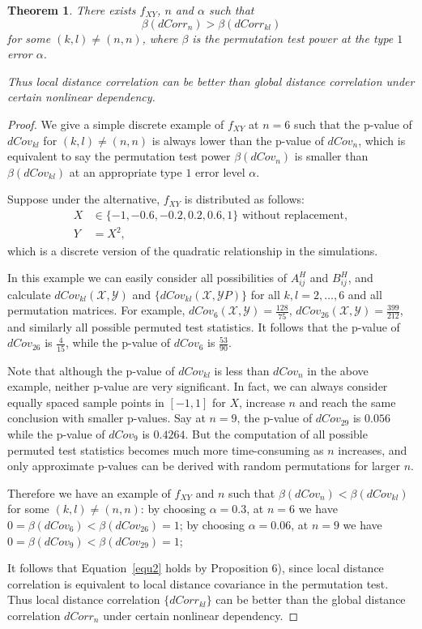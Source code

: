 \documentclass[12pt]{article}
\newtheorem{thm}{Theorem}
\begin{document}
\begin{thm}
\label{thm3}
There exists $f_{XY}$, $n$ and $\alpha$ such that 
\begin{equation}
\label{equ2}
\beta(dCorr_{n}) > \beta(dCorr_{kl})
\end{equation}
for some $(k,l) \neq (n,n)$, where $\beta$ is the permutation test power at the type $1$ error $\alpha$.

Thus local distance correlation can be better than global distance correlation under certain nonlinear dependency.
\end{thm}
\begin{proof}
We give a simple discrete example of $f_{XY}$ at $n=6$ such that the p-value of $dCov_{kl}$ for $(k,l) \neq (n,n)$ is always lower than the p-value of $dCov_{n}$, which is equivalent to say the permutation test power $\beta(dCov_{n})$ is smaller than $\beta(dCov_{kl})$ at an appropriate type $1$ error level $\alpha$.

Suppose under the alternative, $f_{XY}$ is distributed as follows:
\begin{align*} 
X &\in \{-1,-0.6,-0.2,0.2,0.6,1\} \mbox{ without replacement}, \\
Y &= X^2,
\end{align*}
which is a discrete version of the quadratic relationship in the simulations.

In this example we can easily consider all possibilities of $A^{H}_{ij}$ and $B^{H}_{ij}$, and calculate $dCov_{kl}(\mathcal{X}, \mathcal{Y})$ and $\{dCov_{kl}(\mathcal{X}, \mathcal{Y}P)\}$ for all $k,l=2,\ldots,6$ and all permutation matrices. For example, $dCov_{6}(\mathcal{X}, \mathcal{Y})=\frac{128}{75}$, $dCov_{26}(\mathcal{X}, \mathcal{Y})=\frac{399}{212}$, and similarly all possible permuted test statistics. It follows that the p-value of $dCov_{26}$ is $\frac{4}{15}$, while the p-value of $dCov_{6}$ is $\frac{53}{90}$. 

Note that although the p-value of $dCov_{kl}$ is less than $dCov_{n}$ in the above example, neither p-value are very significant. In fact, we can always consider equally spaced sample points in $[-1,1]$ for $X$, increase $n$ and reach the same conclusion with smaller p-values. Say at $n=9$, the p-value of $dCov_{29}$ is $0.056$ while the p-value of $dCov_{9}$ is $0.4264$. But the computation of all possible permuted test statistics becomes much more time-consuming as $n$ increases, and only approximate p-values can be derived with random permutations for larger $n$.

Therefore we have an example of $f_{XY}$ and $n$ such that $\beta(dCov_{n}) < \beta(dCov_{kl})$ for some $(k,l) \neq (n,n)$: by choosing $\alpha=0.3$, at $n=6$ we have $0=\beta(dCov_{6}) < \beta(dCov_{26})=1$; by choosing $\alpha=0.06$, at $n=9$ we have $0=\beta(dCov_{9}) < \beta(dCov_{29})=1$; 

It follows that Equation~\ref{equ2} holds by Proposition 6), since local distance correlation is equivalent to local distance covariance in the permutation test. Thus local distance correlation $\{dCorr_{kl}\}$ can be better than the global distance correlation $dCorr_{n}$ under certain nonlinear dependency. 
\end{proof}
\end{document}
